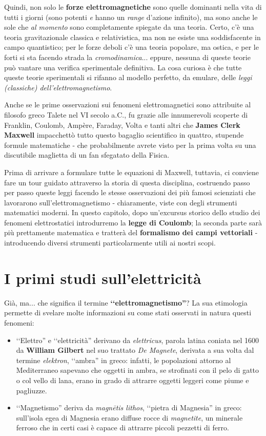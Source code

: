 Quindi, non solo le \textbf{forze elettromagnetiche} sono quelle dominanti nella vita di tutti i giorni (sono potenti \textit{e} hanno un \textit{range} d'azione infinito), ma sono anche le sole che \textit{al momento} sono completamente spiegate da una teoria. Certo, c'è una teoria gravitazionale classica e relativistica, ma non ne esiste una soddisfacente in campo quantistico; per le forze deboli c'è una teoria popolare, ma ostica, e per le forti si sta facendo strada la \textit{cromodinamica}... eppure, nessuna di queste teorie può vantare una verifica sperimentale definitiva. La cosa curiosa è che tutte queste teorie sperimentali si rifanno al modello perfetto, da emulare, delle \textit{leggi (classiche) dell'elettromagnetismo}.

Anche se le prime osservazioni sui fenomeni elettromagnetici sono attribuite al filosofo greco Talete nel VI secolo a.C., fu grazie alle innumerevoli scoperte di Franklin, Coulomb, Ampère, Faraday, Volta e tanti altri che \textbf{James Clerk Maxwell} impacchettò tutto questo bagaglio scientifico in quattro, stupende formule matematiche - che probabilmente avrete visto per la prima volta su una discutibile maglietta di un fan sfegatato della Fisica.

Prima di arrivare a formulare tutte le equazioni di Maxwell, tuttavia, ci conviene fare un tour guidato attraverso la storia di questa disciplina, costruendo passo per passo queste leggi facendo le stesse osservazioni dei più famosi scienziati che lavorarono sull'elettromagnetismo - chiaramente, viste con degli strumenti matematici moderni. In questo capitolo, dopo un'excursus storico dello studio dei fenomeni elettrostatici introdurremo la \textbf{legge di Coulomb}; la seconda parte sarà più prettamente matematica e tratterà del \textbf{formalismo dei campi vettoriali} - introducendo diversi strumenti particolarmente utili ai nostri scopi.
\section{I primi studi sull'elettricità}
Già, ma... che significa il termine \textbf{‘‘elettromagnetismo''}? La sua etimologia permette di svelare molte informazioni su come stati osservati in natura questi fenomeni:
\begin{itemize}
	\item ‘‘Elettro'' e ‘‘elettricità'' derivano da \textit{elettricus}, parola latina coniata nel 1600 da \textbf{William Gilbert} nel suo trattato \textit{De Magnete}, derivata a sua volta dal termine \textit{elektron}, ‘‘ambra'' in greco: infatti, le popolazioni attorno al Mediterraneo sapevano che oggetti in ambra, se strofinati con il pelo di gatto o col vello di lana, erano in grado di attrarre oggetti leggeri come piume e pagliuzze.
	\item ‘‘Magnetismo'' deriva da \textit{magnētis lithos}, ‘‘pietra di Magnesia'' in greco: sull'isola egea di Magnesia erano diffuse rocce di \textit{magnetite}, un minerale ferroso che in certi casi è capace di attrarre piccoli pezzetti di ferro.
\end{itemize}
